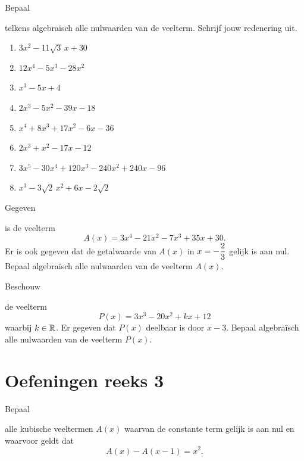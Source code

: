 \documentclass{ximera}
\begin{document}
\begin{exercise} 
\hypertarget{oef4.6}{Bepaal} telkens algebra\"isch alle nulwaarden van de veelterm. Schrijf jouw redenering uit.
\begin{multicols}{2}
\begin{enumerate}
\item
$3x^2-11\sqrt{3}\,x+30$
\item
$12x^4-5x^3-28x^2$
\item
$x^3-5x+4$
\item
$2x^3 - 5x^2 - 39x - 18$
\item
$x^4+8x^3+17x^2-6x-36$
\item
$2x^3+x^2-17x-12$ 
\item
$3x^5-30x^4+120x^3-240x^2+240x-96$
\item
$x^3 - 3\sqrt{2}\,x^2 + 6x - 2\sqrt{2}\,$
\end{enumerate}
\end{multicols}
\end{exercise} 

\begin{exercise} 
\hypertarget{oef4.7}{Gegeven} is de veelterm
\[
A(x) = 3x^4-21x^2-7x^3+35x+30.
\]
Er is ook gegeven dat de getalwaarde van $A(x)$ in $\displaystyle x = -\frac{2}{3}$ gelijk is aan nul. Bepaal algebra\"isch alle nulwaarden van de veelterm $A(x)$.
\end{exercise} 

\begin{exercise} 
\hypertarget{oef4.8}{Beschouw} de veelterm
\[
P(x) = 3x^3-20x^2+kx+12
\]
waarbij $k \in \mathbb{R}$. Er gegeven dat $P(x)$ deelbaar is door $x-3$. Bepaal algebra\"isch alle nulwaarden van de veelterm $P(x)$.
\end{exercise} 














\section*{Oefeningen reeks 3}

\begin{exercise} 
\hypertarget{oef4.9}{Bepaal} alle kubische veeltermen $A(x)$ waarvan de constante term gelijk is aan nul en waarvoor geldt dat
\[
A(x) - A(x-1) = x^2.
\]
\end{exercise} 
\end{document}
